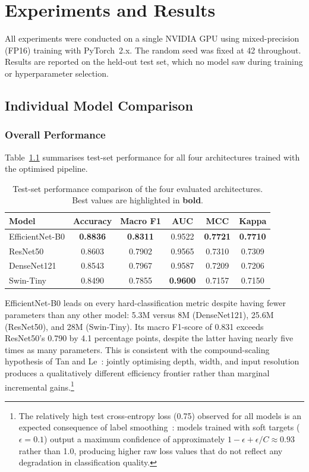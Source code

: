 \chapter{Experiments and Results}

All experiments were conducted on a single NVIDIA GPU using mixed-precision (FP16) training with PyTorch~2.x. The random seed was fixed at 42 throughout. Results are reported on the held-out test set, which no model saw during training or hyperparameter selection.

\section{Individual Model Comparison}

\subsection{Overall Performance}

Table~\ref{tab:model_comparison} summarises test-set performance for all four architectures trained with the optimised pipeline.

\begin{table}[H]
\centering
\caption{Test-set performance comparison of the four evaluated architectures. Best values are highlighted in \textbf{bold}.}
\label{tab:model_comparison}
\begin{tabular}{lccccc}
\toprule
\textbf{Model} & \textbf{Accuracy} & \textbf{Macro F1} & \textbf{AUC} & \textbf{MCC} & \textbf{Kappa} \\
\midrule
EfficientNet-B0 & \textbf{0.8836} & \textbf{0.8311} & 0.9522 & \textbf{0.7721} & \textbf{0.7710} \\
ResNet50        & 0.8603 & 0.7902 & 0.9565 & 0.7310 & 0.7309 \\
DenseNet121     & 0.8543 & 0.7967 & 0.9587 & 0.7209 & 0.7206 \\
Swin-Tiny       & 0.8490 & 0.7855 & \textbf{0.9600} & 0.7157 & 0.7150 \\
\bottomrule
\end{tabular}
\end{table}

EfficientNet-B0 leads on every hard-classification metric despite having fewer parameters than any other model: 5.3M versus 8M (DenseNet121), 25.6M (ResNet50), and 28M (Swin-Tiny). Its macro F1-score of 0.831 exceeds ResNet50's 0.790 by 4.1 percentage points, despite the latter having nearly five times as many parameters. This is consistent with the compound-scaling hypothesis of Tan and Le~\cite{tan2019efficientnet}: jointly optimising depth, width, and input resolution produces a qualitatively different efficiency frontier rather than marginal incremental gains.\footnote{The relatively high test cross-entropy loss (0.75) observed for all models is an expected consequence of label smoothing~\cite{muller2019does}: models trained with soft targets ($\epsilon=0.1$) output a maximum confidence of approximately $1 - \epsilon + \epsilon/C \approx 0.93$ rather than 1.0, producing higher raw loss values that do not reflect any degradation in classification quality.}

